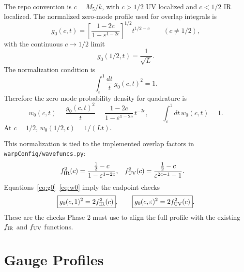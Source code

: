 \documentclass[11pt]{article}
\begin{document}
The repo convention is \(c=M_5/k\), with \(c>1/2\) UV localized and
\(c<1/2\) IR localized.  The normalized zero-mode profile used for overlap
integrals is
\begin{equation}
  \boxed{
  g_0(c,t)
    = \left[\frac{1-2c}{1-\varepsilon^{1-2c}}\right]^{1/2}
      t^{1/2-c}}
  \qquad (c\neq 1/2),
  \label{eq:g0}
\end{equation}
with the continuous \(c\to 1/2\) limit
\begin{equation}
  g_0(1/2,t) = \frac{1}{\sqrt{L}}.
\end{equation}
The normalization condition is
\begin{equation}
  \int_\varepsilon^1 \frac{dt}{t}\, g_0(c,t)^2 = 1.
  \label{eq:g0-normalization}
\end{equation}
Therefore the zero-mode probability density for quadrature is
\begin{equation}
  \boxed{
  w_0(c,t) =
  \frac{g_0(c,t)^2}{t}
  = \frac{1-2c}{1-\varepsilon^{1-2c}}\,t^{-2c}},
  \qquad
  \int_\varepsilon^1 dt\,w_0(c,t)=1.
  \label{eq:w0}
\end{equation}
At \(c=1/2\), \(w_0(1/2,t)=1/(Lt)\).

This normalization is tied to the implemented overlap factors in
\texttt{warpConfig/wavefuncs.py}:
\begin{align}
  f_{\rm IR}^2(c) &=
  \frac{\frac{1}{2}-c}{1-\varepsilon^{1-2c}},
  &
  f_{\rm UV}^2(c) &=
  \frac{\frac{1}{2}-c}{\varepsilon^{2c-1}-1}.
\end{align}
Equations~\eqref{eq:g0}--\eqref{eq:w0} imply the endpoint checks
\begin{equation}
  \boxed{g_0(c,1)^2 = 2 f_{\rm IR}^2(c)}, \qquad
  \boxed{g_0(c,\varepsilon)^2 = 2 f_{\rm UV}^2(c)}.
  \label{eq:ffactor-checks}
\end{equation}
These are the checks Phase 2 must use to align the full profile with the
existing \(f_{\rm IR}\) and \(f_{\rm UV}\) functions.

\section{Gauge Profiles}
\end{document}

